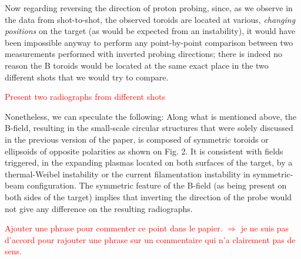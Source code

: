 \documentclass[aps,showpacs,superscriptaddress]{revtex4}%
\begin{document}
\begin{enumerate}
Now regarding  reversing the direction of proton probing,
%
since, as we observe in the data from shot-to-shot, the observed toroids are located at various, \emph{changing positions} on the target (as would be expected from an instability), it would have been impossible anyway to perform any point-by-point comparison between two measurements performed with inverted probing directions; there is indeed no reason the B toroids would be located at the same exact place in the two different shots that we would try to compare.

\textcolor{red}{Present two radiographs from different shots}

Nonetheless, we can speculate the following: Along what is mentioned above, the B-field, resulting in the small-scale circular structures that were solely discussed in the previous version of the paper, is composed of symmetric toroids or ellipsoids of opposite polarities as shown on Fig. 2. 
It is consistent with fields triggered, in the expanding plasmas located on both surfaces of the target, by a thermal-Weibel instability or the current filamentation instability in symmetric-beam configuration. 
The symmetric feature of the B-field (as being present on both sides of the target) implies that inverting the direction of the probe would not give any difference on the resulting radiographs.

\textcolor{red}{
Ajouter une phrase pour commenter ce point dans le papier. $\Rightarrow$  je ne suis pas d'accord pour rajouter une phrase sur un commentaire qui n'a clairement pas de sens.
}


\end{enumerate}
\end{document}
